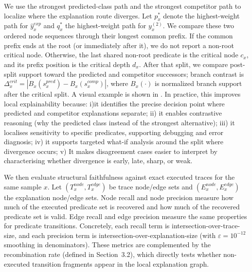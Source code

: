 \documentclass[runningheads]{llncs}
\begin{document}
We use the strongest predicted-class path and the strongest competitor path to
localize where the explanation route diverges. Let $p_x^\ast$ denote the
highest-weight path for $\hat{y}^{exp}_x$ and $q_x^\ast$ the highest-weight path
for $y_x^{(2)}$. We compare these two ordered node sequences through their
longest common prefix. If the common prefix ends at the root (or immediately
after it), we do not report a non-root critical node. Otherwise, the last shared
non-root predicate is the critical node $c_x$, and its prefix position is the
critical depth $d_x$. After that split, we compare post-split support toward the
predicted and competitor successors; branch contrast is
$\Delta_x^{crit}=|B_x(s_x^{pred})-B_x(s_x^{comp})|$, where $B_x(\cdot)$ is
normalized branch support after the critical split. A visual example is shown
in .
In practice, this improves local explainability because:
  i)it identifies the precise decision point where predicted and competitor explanations separate;
  ii) it enables contrastive reasoning (why the predicted class instead of the strongest alternative);
  iii) it localises sensitivity to specific predicates, supporting debugging and error diagnosis;
  iv) it supports targeted what-if analysis around the split where divergence occurs;
  v) It makes disagreement cases easier to interpret by characterising whether divergence is early, late, sharp, or weak.

We then evaluate structural faithfulness against exact executed traces for the same sample $x$. Let $(T_x^{node},T_x^{edge})$ be trace node/edge sets and $(E_x^{node},E_x^{edge})$ the explanation node/edge sets. Node recall and node precision measure how much of the executed predicate set is recovered and how much of the recovered predicate set is valid. Edge recall and edge precision measure the same properties for predicate transitions. Concretely, each recall term is intersection-over-trace-size, and each precision term is intersection-over-explanation-size (with $\varepsilon=10^{-12}$ smoothing in denominators).
These metrics are complemented by the recombination rate (defined in
Section~3.2), which directly tests whether non-executed transition fragments appear in the local explanation graph.
\end{document}
